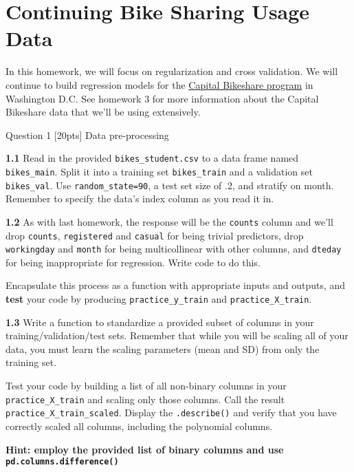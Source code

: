 \documentclass[11pt]{article}
\begin{document}
    \section{Continuing Bike Sharing Usage
Data}\label{continuing-bike-sharing-usage-data}

In this homework, we will focus on regularization and cross validation.
We will continue to build regression models for the
\href{https://www.capitalbikeshare.com}{Capital Bikeshare program} in
Washington D.C. See homework 3 for more information about the Capital
Bikeshare data that we'll be using extensively.

     Question 1 {[}20pts{]} Data pre-processing 

    \textbf{1.1} Read in the provided \texttt{bikes\_student.csv} to a data
frame named \texttt{bikes\_main}. Split it into a training set
\texttt{bikes\_train} and a validation set \texttt{bikes\_val}. Use
\texttt{random\_state=90}, a test set size of .2, and stratify on month.
Remember to specify the data's index column as you read it in.

\textbf{1.2} As with last homework, the response will be the
\texttt{counts} column and we'll drop \texttt{counts},
\texttt{registered} and \texttt{casual} for being trivial predictors,
drop \texttt{workingday} and \texttt{month} for being multicollinear
with other columns, and \texttt{dteday} for being inappropriate for
regression. Write code to do this.

Encapsulate this process as a function with appropriate inputs and
outputs, and \textbf{test} your code by producing
\texttt{practice\_y\_train} and \texttt{practice\_X\_train}.

\textbf{1.3} Write a function to standardize a provided subset of
columns in your training/validation/test sets. Remember that while you
will be scaling all of your data, you must learn the scaling parameters
(mean and SD) from only the training set.

Test your code by building a list of all non-binary columns in your
\texttt{practice\_X\_train} and scaling only those columns. Call the
result \texttt{practice\_X\_train\_scaled}. Display the
\texttt{.describe()} and verify that you have correctly scaled all
columns, including the polynomial columns.

\textbf{Hint: employ the provided list of binary columns and use
\texttt{pd.columns.difference()}}
\end{document}
